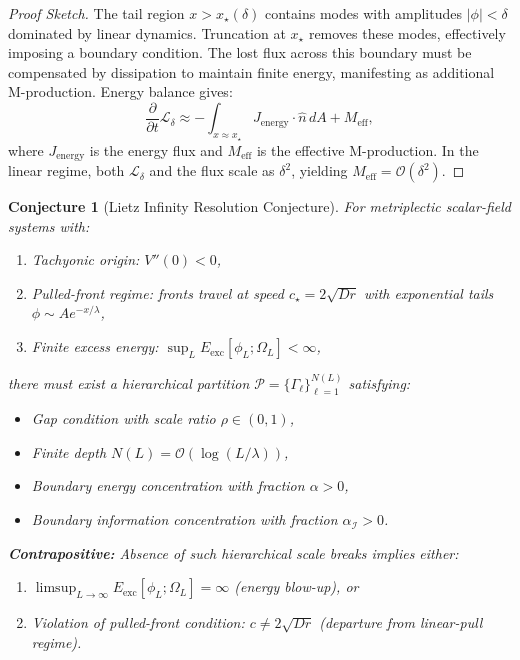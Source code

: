 \documentclass{article}
\newtheorem{conjecture}{Conjecture}
\begin{document}
\begin{proof}[Proof Sketch]
The tail region $x > x_\star(\delta)$ contains modes with amplitudes $|\phi| < \delta$ dominated by linear dynamics. Truncation at $x_\star$ removes these modes, effectively imposing a boundary condition. The lost flux across this boundary must be compensated by dissipation to maintain finite energy, manifesting as additional M-production. Energy balance gives:
\begin{equation}
\frac{\partial}{\partial t} \mathcal{L}_\delta \approx -\int_{x \approx x_\star} J_{\text{energy}} \cdot \hat{n}\, dA + M_{\text{eff}},
\end{equation}
where $J_{\text{energy}}$ is the energy flux and $M_{\text{eff}}$ is the effective M-production. In the linear regime, both $\mathcal{L}_\delta$ and the flux scale as $\delta^2$, yielding $M_{\text{eff}} = \mathcal{O}(\delta^2)$.
\end{proof}

\begin{conjecture}[Lietz Infinity Resolution Conjecture]
\label{conj:main}
For metriplectic scalar-field systems with:
\begin{enumerate}[noitemsep]
\item Tachyonic origin: $V''(0) < 0$,
\item Pulled-front regime: fronts travel at speed $c_\star = 2\sqrt{Dr}$ with exponential tails $\phi \sim A e^{-x/\lambda}$,
\item Finite excess energy: $\sup_L E_{\text{exc}}[\phi_L; \Omega_L] < \infty$,
\end{enumerate}
there must exist a hierarchical partition $\mathcal{P} = \{\Gamma_\ell\}_{\ell=1}^{N(L)}$ satisfying:
\begin{itemize}[noitemsep]
\item Gap condition with scale ratio $\rho \in (0,1)$,
\item Finite depth $N(L) = \mathcal{O}(\log(L/\lambda))$,
\item Boundary energy concentration with fraction $\alpha > 0$,
\item Boundary information concentration with fraction $\alpha_{\mathcal{I}} > 0$.
\end{itemize}

\textbf{Contrapositive:} Absence of such hierarchical scale breaks implies either:
\begin{enumerate}[label=(\roman*)]
\item $\limsup_{L \to \infty} E_{\text{exc}}[\phi_L; \Omega_L] = \infty$ (energy blow-up), or
\item Violation of pulled-front condition: $c \neq 2\sqrt{Dr}$ (departure from linear-pull regime).
\end{enumerate}
\end{conjecture}
\end{document}
